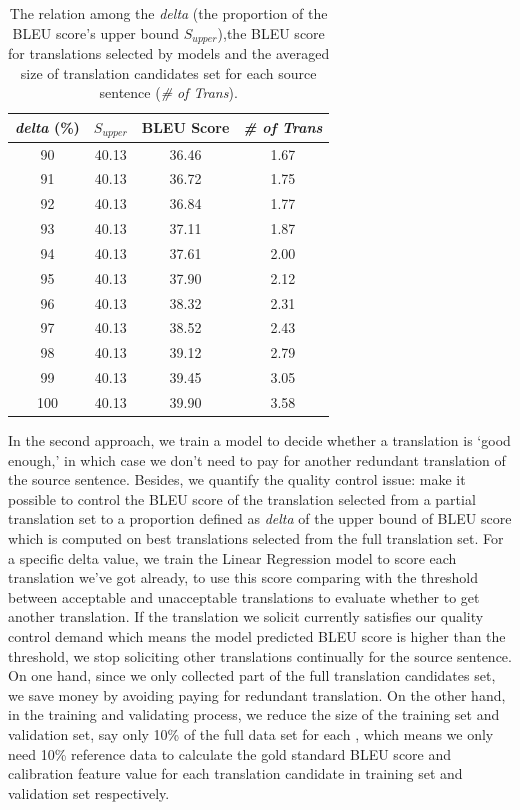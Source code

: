 \documentclass[11pt]{article}
\begin{document}
 \begin{table}[h]
\begin{tabular}{|c|c|c|c|}
\hline

\textit{delta} (\%) & $S_{upper}$ & BLEU Score & \textit{\# of Trans} \\ \hline
90         & 40.13       & 36.46      & 1.67       \\ \hline
91         & 40.13       & 36.72      & 1.75       \\ \hline
92         & 40.13       & 36.84      & 1.77       \\ \hline
93         & 40.13       & 37.11      & 1.87       \\ \hline
94         & 40.13       & 37.61      & 2.00       \\ \hline
95         & 40.13       & 37.90      & 2.12       \\ \hline
96         & 40.13       & 38.32      & 2.31       \\ \hline
97         & 40.13       & 38.52      & 2.43       \\ \hline
98         & 40.13       & 39.12      & 2.79       \\ \hline
99         & 40.13       & 39.45      & 3.05       \\ \hline
100        & 40.13       & 39.90      & 3.58       \\ \hline
\end{tabular}
\caption{The relation among the \textit{delta} (the proportion of the BLEU score's upper bound $S_{upper}$),the BLEU score for translations selected by models and the averaged size of translation candidates set for each source sentence (\textit{\# of Trans}).  }
    \label{orderanother}
\end{table}

 In the second approach,  we train a model to decide whether a translation  is `good enough,' in which case we don't need to  pay for another redundant translation of the source sentence. Besides, we quantify the quality control  issue: make it possible to control the BLEU score of the translation selected from a partial translation set to a proportion defined as \textit{delta} of the upper bound of BLEU score which is computed on best translations selected from  the full translation set. For a specific delta value, we train the Linear Regression model to score each translation we've got already, to use this score comparing with the threshold between acceptable and unacceptable translations to evaluate whether to get another translation.  If the translation we solicit currently satisfies our quality control demand which means the model predicted BLEU score is higher than the threshold, we stop soliciting other translations continually for the source sentence. On one hand, since we only collected part of the full translation candidates set, we save money by avoiding paying for  redundant   translation.  On the other hand, in the training and validating process, we reduce the size of the training set and validation set, say only 10\% of the full data set for each , which means we only need 10\% reference data to calculate the gold standard BLEU score and calibration feature value for each translation candidate in training set and validation set respectively. 
 
\end{document}
